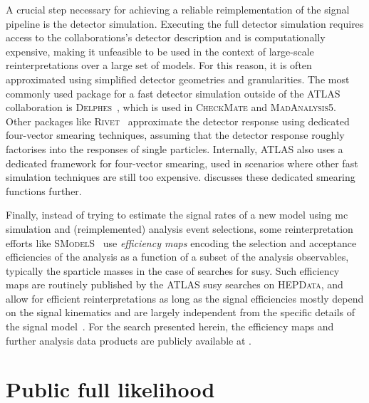 A crucial step necessary for achieving a reliable reimplementation of the signal pipeline is the detector simulation. Executing the full detector simulation requires access to the collaborations's detector description and is computationally expensive, making it unfeasible to be used in the context of large-scale reinterpretations over a large set of models. For this reason, it is often approximated using simplified detector geometries and granularities. The most commonly used package for a fast detector simulation outside of the ATLAS collaboration is \textsc{Delphes}~\cite{Delphes:2009tx}, which is used in \eg \textsc{CheckMate} and \textsc{MadAnalysis5}. Other packages like \eg \textsc{Rivet}~\cite{Rivet1:2010ar,Rivet2:2019stt} approximate the detector response using dedicated four-vector smearing techniques, assuming that the detector response roughly factorises into the responses of single particles. Internally, ATLAS also uses a dedicated framework for four-vector smearing, used in scenarios where other fast simulation techniques are still too expensive.  discusses these dedicated smearing functions further.

Finally, instead of trying to estimate the signal rates of a new model using \gls{mc} simulation and (reimplemented) analysis event selections, some reinterpretation efforts like \eg \textsc{SModelS}~\cite{SModelS1:2013mwa,SModelS2:2017neo} use \textit{efficiency maps} encoding the selection and acceptance efficiencies of the analysis as a function of a subset of the analysis observables, typically the sparticle masses in the case of searches for \gls{susy}. Such efficiency maps are routinely published by the ATLAS \gls{susy} searches on \textsc{HEPData}, and allow for efficient reinterpretations as long as the signal efficiencies mostly depend on the signal kinematics and are largely independent from the specific details of the signal model~\cite{SModelS1:2013mwa}. For the \onelepton search presented herein, the efficiency maps and further analysis data products are publicly available at \cite{HEPdata_1Lbb}. 

\section{Public full likelihood}\label{sec:full_likelihood}

